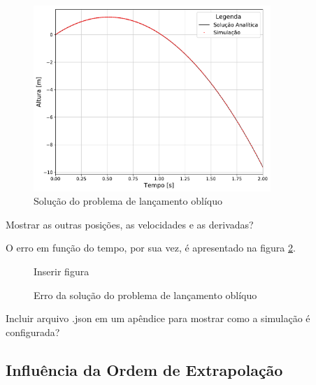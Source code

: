 \begin{figure}[h]
	\caption{Solução do problema de lançamento oblíquo}
	\begin{center}
		\includegraphics[width=0.8\textwidth]{images/falling_sphere/y_position.pdf}
	\end{center}
	\label{fig:falling_sphere}
\end{figure}

\alert{Mostrar as outras posições, as velocidades e as derivadas?}

O erro em função do tempo, por sua vez, é apresentado na figura \ref{fig:falling_sphere_error}.

\begin{figure}[h]
	\caption{Erro da solução do problema de lançamento oblíquo}
	\begin{center}
		\alert{Inserir figura}
	\end{center}
	\label{fig:falling_sphere_error}
\end{figure}

\alert{Incluir arquivo .json em um apêndice para mostrar como a simulação é configurada?}

\subsection{Influência da Ordem de Extrapolação}

